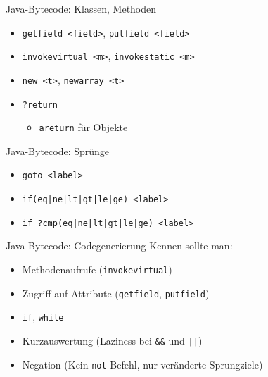 \documentclass{beamer}
\begin{document}
\begin{frame}{Java-Bytecode: Klassen, Methoden}
	\begin{itemize}
		\item \texttt{getfield <field>}, \texttt{putfield <field>}
		\item \texttt{invokevirtual <m>}, \texttt{invokestatic <m>}
		\item \texttt{new <t>}, \texttt{newarray <t>}
		\item \texttt{?return}
		\begin{itemize}
			\item \texttt{areturn} für Objekte
		\end{itemize}
	\end{itemize}
\end{frame}

\begin{frame}{Java-Bytecode: Sprünge}
	\begin{itemize}
		\item \texttt{goto <label>}
		\item \texttt{if(eq|ne|lt|gt|le|ge) <label>}
		\item \texttt{if_?cmp(eq|ne|lt|gt|le|ge) <label>}
	\end{itemize}
\end{frame}

\begin{frame}{Java-Bytecode: Codegenerierung}
	Kennen sollte man:

	\begin{itemize}
		\item Methodenaufrufe (\texttt{invokevirtual})
		\item Zugriff auf Attribute (\texttt{getfield}, \texttt{putfield})
		\item \texttt{if}, \texttt{while}
		\item Kurzauswertung (Laziness bei \texttt{\&\&} und \texttt{\string|\string|})
		\item Negation (Kein \texttt{not}-Befehl, nur veränderte Sprungziele)
	\end{itemize}
\end{frame}
\end{document}
